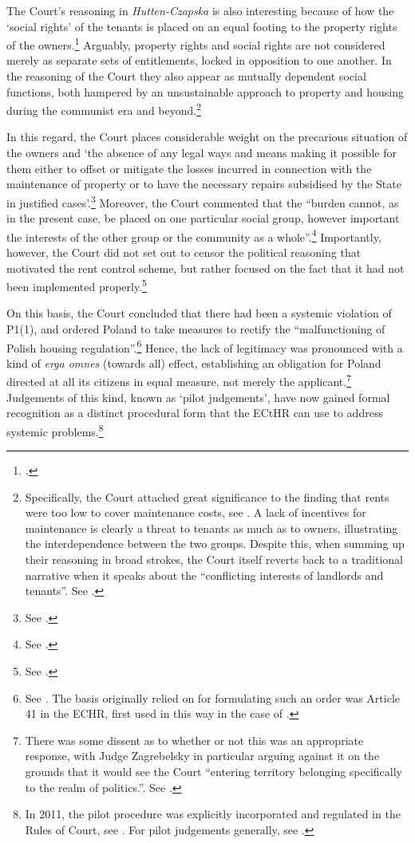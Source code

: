 The Court's reasoning in {\it Hutten-Czapska} is also interesting because of how the `social rights' of the tenants is placed on an equal footing to the property rights of the owners.\footcite[225]{hutten06} Arguably, property rights and social rights are not considered merely as separate sets of entitlements, locked in opposition to one another. In the reasoning of the Court they also appear as mutually dependent social functions, both hampered by an unsustainable approach to property and housing during the communist era and beyond.\footnote{Specifically, the Court attached great significance to the finding that rents were too low to cover maintenance costs, see \cite[224]{hutten06}. A lack of incentives for maintenance is clearly a threat to tenants as much as to owners, illustrating the interdependence between the two groups. Despite this, when summing up their reasoning in broad strokes, the Court itself reverts back to a traditional narrative when it speaks about the ``conflicting interests of landlords and tenants''. See \cite[225]{hutten06}.}

In this regard, the Court places considerable weight on the precarious situation of the owners and `the absence of any legal ways and means making it possible for them either to offset or mitigate the losses incurred in connection with the maintenance of property or to have the necessary repairs subsidised by the State in justified cases'.\footnote{See \cite[224]{hutten06}.} Moreover, the Court commented that the ``burden cannot, as in the present case, be placed on one particular social group, however important the interests of the other group or the community as a whole''.\footnote{See \cite[225]{hutten06}.} Importantly, however, the Court did not set out to censor the political reasoning that motivated the rent control scheme, but rather focused on the fact that it had not been implemented properly.\footnote{See \cite[224]{hutten06}.}

On this basis, the Court concluded that there had been a systemic violation of P1(1), and ordered Poland to take measures to rectify the ``malfunctioning of Polish housing regulation''.\footnote{See \cite[237]{hutten06}. The basis originally relied on for formulating such an order was Article 41 in the ECHR, first used in this way in the case of \cite{broniowski05}.} Hence, the lack of legitimacy was pronounced with a kind of {\it erga omnes} (towards all) effect, establishing an obligation for Poland directed at all its citizens in equal measure, not merely the applicant.\footnote{There was some dissent as to whether or not this was an appropriate response, with Judge Zagrebelsky in particular arguing against it on the grounds that it would see the Court ``entering territory belonging specifically to the realm of politics.''. See \cite{hutten06}.} Judgements of this kind, known as `pilot judgements', have now gained formal recognition as a distinct procedural form that the ECtHR can use to address systemic problems.\footnote{In 2011, the pilot procedure was explicitly incorporated and regulated in the Rules of Court, see \cite[87]{leach11}. For pilot judgements generally, see \cite{leach10}.}

